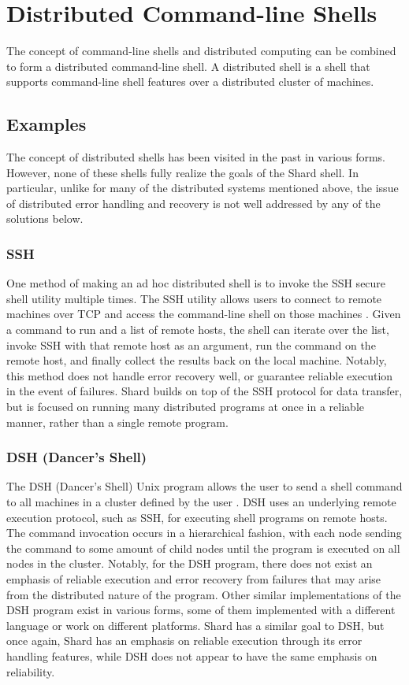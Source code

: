 \documentclass[oneside]{report}
\begin{document}
\section{Distributed Command-line Shells}
The concept of command-line shells and distributed computing can be combined to form a distributed command-line shell.
A distributed shell is a shell that supports command-line shell features over a distributed cluster of machines.

\subsection{Examples}
The concept of distributed shells has been visited in the past in various forms.
However, none of these shells fully realize the goals of the Shard shell.
In particular, unlike for many of the distributed systems mentioned above, the issue of distributed error handling and recovery is not well addressed by any of the solutions below.

\subsubsection{SSH}
One method of making an ad hoc distributed shell is to invoke the SSH secure shell utility multiple times.
The SSH utility allows users to connect to remote machines over TCP and access the command-line shell on those machines \cite{rfc4251}.
Given a command to run and a list of remote hosts, the shell can iterate over the list, invoke SSH with that remote host as an argument, run the command on the remote host, and finally collect the results back on the local machine.
Notably, this method does not handle error recovery well, or guarantee reliable execution in the event of failures.
Shard builds on top of the SSH protocol for data transfer, but is focused on running many distributed programs at once in a reliable manner, rather than a single remote program.

\subsubsection{DSH (Dancer's Shell)}
The DSH (Dancer's Shell) Unix program allows the user to send a shell command to all machines in a cluster defined by the user \cite{dshdancer}.
DSH uses an underlying remote execution protocol, such as SSH, for executing shell programs on remote hosts.
The command invocation occurs in a hierarchical fashion, with each node sending the command to some amount of child nodes until the program is executed on all nodes in the cluster.
Notably, for the DSH program, there does not exist an emphasis of reliable execution and error recovery from failures that may arise from the distributed nature of the program.
Other similar implementations of the DSH program exist in various forms, some of them implemented with a different language or work on different platforms.
Shard has a similar goal to DSH, but once again, Shard has an emphasis on reliable execution through its error handling features, while DSH does not appear to have the same emphasis on reliability.
\end{document}
